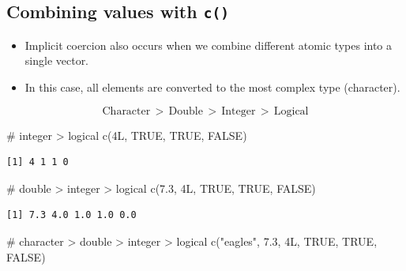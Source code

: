 \documentclass[
  letterpaper,
  DIV=11,
  numbers=noendperiod]{scrreprt}
\newenvironment{Shaded}{\begin{snugshade}}{\end{snugshade}}
\newcommand{\CommentTok}[1]{\textcolor[rgb]{0.37,0.37,0.37}{#1}}
\newcommand{\ConstantTok}[1]{\textcolor[rgb]{0.56,0.35,0.01}{#1}}
\newcommand{\DecValTok}[1]{\textcolor[rgb]{0.68,0.00,0.00}{#1}}
\newcommand{\FloatTok}[1]{\textcolor[rgb]{0.68,0.00,0.00}{#1}}
\newcommand{\FunctionTok}[1]{\textcolor[rgb]{0.28,0.35,0.67}{#1}}
\newcommand{\NormalTok}[1]{\textcolor[rgb]{0.00,0.23,0.31}{#1}}
\newcommand{\StringTok}[1]{\textcolor[rgb]{0.13,0.47,0.30}{#1}}
\begin{document}
\subsection{\texorpdfstring{Combining values with
\texttt{c()}}{Combining values with c()}}\label{combining-values-with-c}

\begin{itemize}
\item
  Implicit coercion also occurs when we combine different atomic types
  into a single vector.
\item
  In this case, all elements are converted to the most complex type
  (character).
\end{itemize}

\[
\text{Character} \, > \, \text{Double} \, > \, \text{Integer} \, > \, \text{Logical}
\]

\begin{Shaded}
\begin{Highlighting}[]
\CommentTok{\# integer \textgreater{} logical}
\FunctionTok{c}\NormalTok{(}\DecValTok{4}\NormalTok{L, }\ConstantTok{TRUE}\NormalTok{, }\ConstantTok{TRUE}\NormalTok{, }\ConstantTok{FALSE}\NormalTok{)                   }
\end{Highlighting}
\end{Shaded}

\begin{verbatim}
[1] 4 1 1 0
\end{verbatim}

\begin{Shaded}
\begin{Highlighting}[]
\CommentTok{\# double \textgreater{} integer \textgreater{} logical}
\FunctionTok{c}\NormalTok{(}\FloatTok{7.3}\NormalTok{, }\DecValTok{4}\NormalTok{L, }\ConstantTok{TRUE}\NormalTok{, }\ConstantTok{TRUE}\NormalTok{, }\ConstantTok{FALSE}\NormalTok{)              }
\end{Highlighting}
\end{Shaded}

\begin{verbatim}
[1] 7.3 4.0 1.0 1.0 0.0
\end{verbatim}

\begin{Shaded}
\begin{Highlighting}[]
\CommentTok{\# character \textgreater{} double \textgreater{} integer \textgreater{} logical}
\FunctionTok{c}\NormalTok{(}\StringTok{"eagles"}\NormalTok{, }\FloatTok{7.3}\NormalTok{, }\DecValTok{4}\NormalTok{L, }\ConstantTok{TRUE}\NormalTok{, }\ConstantTok{TRUE}\NormalTok{, }\ConstantTok{FALSE}\NormalTok{)    }
\end{Highlighting}
\end{Shaded}
\end{document}
